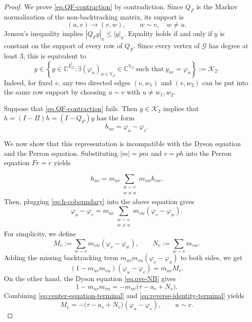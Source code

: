 \documentclass[11pt,twoside, a4paper]{article}
\numberwithin{equation}{section}
\numberwithin{figure}{section}
\theoremstyle{plain} %
\theoremstyle{definition}
\theoremstyle{remark}
\newcommand{\1} {\mspace{1 mu}}
\newcommand{\2} {\mspace{2 mu}}
\newcommand{\C} {{\mathbb{C}}}
\begin{document}
\begin{proof}
    We prove \eqref{eq.QF-contraction} by contradiction.  Since
    \(Q_F\) is the Markov normalization of the non-backtracking matrix, its
    support is
    \[
        (u,v)\longrightarrow (v,w),
        \qquad w\sim v,\quad w\ne u .
    \]
    Jensen's inequality implies  $|Q_Fy|_\pi\le |y|_\pi $.
    Equality holds if and only if \(y\) is
    constant on the support of every row of \(Q_F\).  Since every vertex of
    \(\mathcal G\) has degree at least \(3\), this is equivalent to
    \begin{equation}\label{eq:NB-equality-space}
      y\in\left\{y\in\C^{\vec E_{\mathcal G}}:\exists(\varphi_u)_{u\in \mathbb{V}_{\mathcal G}}\in\C^{\mathbb V_{\mathcal G}}~\text{such that}~y_{uv}= \varphi_u\right\}:=\mathcal{K}_2.
    \end{equation}
    Indeed, for fixed \(v\), any two directed edges \((v,w_1)\) and
    \((v,w_2)\) can be put into the same row support by choosing
    \(u\sim v\) with \(u\ne w_1,w_2\). 

    Suppose that \eqref{eq.QF-contraction} fails. Then $y\in\mathcal{K}_2$ implies that $h=(I-\Pi)h=(I-Q_F)y$ has the form
    \begin{equation}\label{eq:h-coboundary}
        h_{uv}=\varphi_u-\varphi_v .
    \end{equation}

    We now show that this representation is incompatible with the Dyson equation and
    the Perron equation.
    Substituting $|m|=pm$ and $r=ph$ into the Perron equation $Fr=r$ yields

    \[
        h_{uv}
        =
        m_{uv}\sum_{\substack{w\sim v\\ w\ne u}}m_{vw} h_{vw} .
    \]
    Then, plugging \eqref{eq:h-coboundary} into the above equation gives
    \begin{equation}\label{eq:bad-perron-terminal}
        \varphi_u-\varphi_v
        =
        m_{uv}\sum_{\substack{w\sim v\\ w\ne u}}
        m_{vw}(\varphi_v-\varphi_w).
    \end{equation}
    For simplicity, we define
    \[
        M_v:=\sum_{w\sim v}m_{vw}(\varphi_v-\varphi_w),\qquad
        N_v:=\sum_{w\sim v}m_{vw}.
    \]
    Adding the missing backtracking term \(m_{uv}m_{vu}(\varphi_v-\varphi_u)\) to both sides, we get
    \begin{equation}\label{eq:center-equation-terminal}
        (1-m_{uv}m_{vu})(\varphi_u-\varphi_v)
        =
        m_{uv}M_v.
    \end{equation}
    On the other hand, the Dyson equation \eqref{eq.qve-NB} gives
    \begin{equation}\label{eq:reverse-identity-terminal}
        1-m_{uv}m_{vu}
        =
        -m_{uv}\big(\tau-a_v+N_v\big).
    \end{equation}
    Combining \eqref{eq:center-equation-terminal} and \eqref{eq:reverse-identity-terminal} yields 
    \begin{equation}
      M_v=-\big(\tau-a_v+N_v\big)(\varphi_u-\varphi_v),\qquad u\sim v.
    \end{equation}



\end{proof}
\end{document}
